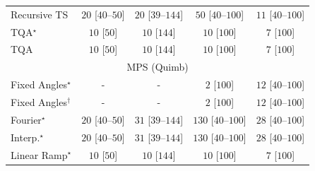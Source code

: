\begin{tabular}{l|cccc|}
Recursive TS & {\cellcolor[HTML]{F4FBF2}} \color[HTML]{000000} $20$ [$40$--$50$] & {\cellcolor[HTML]{F4FBF2}} \color[HTML]{000000} $20$ [$39$--$144$] & {\cellcolor[HTML]{EFF9EB}} \color[HTML]{000000} $50$ [$40$--$100$] & {\cellcolor[HTML]{F6FCF4}} \color[HTML]{000000} $11$ [$40$--$100$] \\
TQA$^\star$ & {\cellcolor[HTML]{F6FCF4}} \color[HTML]{000000} $10$ [$50$] & {\cellcolor[HTML]{F6FCF4}} \color[HTML]{000000} $10$ [$144$] & {\cellcolor[HTML]{F6FCF4}} \color[HTML]{000000} $10$ [$100$] & {\cellcolor[HTML]{F6FCF4}} \color[HTML]{000000} $7$ [$100$] \\
TQA & {\cellcolor[HTML]{F6FCF4}} \color[HTML]{000000} $10$ [$50$] & {\cellcolor[HTML]{F6FCF4}} \color[HTML]{000000} $10$ [$144$] & {\cellcolor[HTML]{F6FCF4}} \color[HTML]{000000} $10$ [$100$] & {\cellcolor[HTML]{F6FCF4}} \color[HTML]{000000} $7$ [$100$] \\
\cline{1-5}
\multicolumn{5}{c}{\rule{0pt}{8pt}MPS (Quimb)} \\
\midrule
Fixed Angles$^\star$ & {\cellcolor[HTML]{000000}} \color[HTML]{F1F1F1} {\cellcolor{white}} \color{black} - & {\cellcolor[HTML]{000000}} \color[HTML]{F1F1F1} {\cellcolor{white}} \color{black} - & {\cellcolor[HTML]{F7FCF5}} \color[HTML]{000000} $2$ [$100$] & {\cellcolor[HTML]{F5FBF3}} \color[HTML]{000000} $12$ [$40$--$100$] \\
Fixed Angles$^\dagger$ & {\cellcolor[HTML]{000000}} \color[HTML]{F1F1F1} {\cellcolor{white}} \color{black} - & {\cellcolor[HTML]{000000}} \color[HTML]{F1F1F1} {\cellcolor{white}} \color{black} - & {\cellcolor[HTML]{F7FCF5}} \color[HTML]{000000} $2$ [$100$] & {\cellcolor[HTML]{F5FBF3}} \color[HTML]{000000} $12$ [$40$--$100$] \\
Fourier$^\star$ & {\cellcolor[HTML]{F4FBF2}} \color[HTML]{000000} $20$ [$40$--$50$] & {\cellcolor[HTML]{F2FAEF}} \color[HTML]{000000} $31$ [$39$--$144$] & {\cellcolor[HTML]{DCF2D7}} \color[HTML]{000000} $130$ [$40$--$100$] & {\cellcolor[HTML]{F2FAF0}} \color[HTML]{000000} $28$ [$40$--$100$] \\
Interp.$^\star$ & {\cellcolor[HTML]{F4FBF2}} \color[HTML]{000000} $20$ [$40$--$50$] & {\cellcolor[HTML]{F2FAEF}} \color[HTML]{000000} $31$ [$39$--$144$] & {\cellcolor[HTML]{DCF2D7}} \color[HTML]{000000} $130$ [$40$--$100$] & {\cellcolor[HTML]{F2FAF0}} \color[HTML]{000000} $28$ [$40$--$100$] \\
Linear Ramp$^\star$ & {\cellcolor[HTML]{F6FCF4}} \color[HTML]{000000} $10$ [$50$] & {\cellcolor[HTML]{F6FCF4}} \color[HTML]{000000} $10$ [$144$] & {\cellcolor[HTML]{F6FCF4}} \color[HTML]{000000} $10$ [$100$] & {\cellcolor[HTML]{F6FCF4}} \color[HTML]{000000} $7$ [$100$] \\

\end{tabular}
